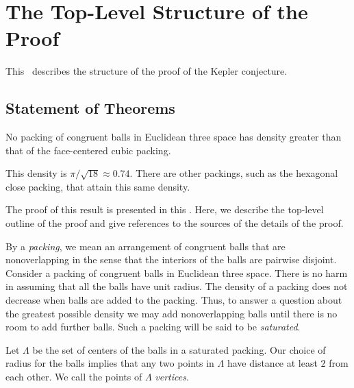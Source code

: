 



\label{part:form}
\chapter{The Top-Level Structure of the Proof}

\label{sec:overview}

This \chap\ describes the structure of the proof of the
 Kepler conjecture.


\section{Statement of Theorems}\label{sec:statement}


\begin{theorem}
\label{theorem:kepler}   No packing of congruent balls in
Euclidean three space has density greater than that of the
face-centered cubic packing.
\end{theorem}

\begin{remark}
This density is $\pi/\sqrt{18}\approx 0.74.$  There are other
packings, such as the hexagonal close packing, that attain this
same density.
\end{remark}

The proof of this result is presented in this \paper. Here, we
describe the top-level outline of the proof and give references to
the sources of the details of the proof.

By a {\it packing}, we mean an arrangement of congruent balls that
are nonoverlapping in the sense that the interiors of the balls are
pairwise disjoint. Consider a  packing of congruent
balls in Euclidean three space. There is no harm in assuming that
all the balls have unit radius. The density of a packing does not
decrease when balls are added to the packing. Thus, to answer a
question about the greatest possible density we may add
nonoverlapping balls until there is no room to add further balls.
Such a packing will be said to be {\it saturated}.
%

Let $\Lambda$ be the set of centers of the balls in a
 saturated packing. Our choice of radius for the
balls implies that any two points in $\Lambda$ have distance at
least $2$ from each other. We call the points of $\Lambda$ {\it
{} vertices}.

